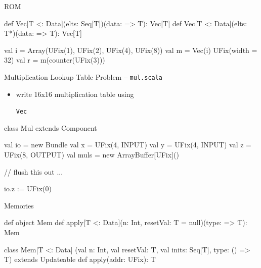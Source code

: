 \documentclass[xcolor=pdflatex,dvipsnames,table]{beamer}
\newcommand{\code}[1]{\begin{footnotesize}{\tt #1}\end{footnotesize}}
\begin{document}
\begin{frame}[fragile]{ROM}

\begin{scala}
def Vec[T <: Data](elts: Seq[T])(data: => T): Vec[T]
def Vec[T <: Data](elts: T*)(data: => T): Vec[T]
\end{scala}

\begin{scala}
val i = Array(UFix(1), UFix(2), UFix(4), UFix(8))
val m = Vec(i){ UFix(width = 32) }
val r = m(counter(UFix(3)))
\end{scala}

% 

\end{frame}

\begin{frame}[fragile]{Multiplication Lookup Table Problem -- \tt mul.scala}
\begin{itemize}
\item write 16x16 multiplication table using \code{Vec}
\end{itemize}
\begin{scala}
class Mul extends Component {
  val io = new Bundle {
    val x   = UFix(4, INPUT)
    val y   = UFix(4, INPUT)
    val z   = UFix(8, OUTPUT)
  }
  val muls = new ArrayBuffer[UFix]()

  // flush this out ...

  io.z := UFix(0)
}
\end{scala}

\end{frame}

\begin{frame}[fragile]{Memories}

\begin{scala}
def object Mem {
  def apply[T <: Data](n: Int, resetVal: T = null)(type: => T): Mem
}

class Mem[T <: Data]
    (val n: Int, val resetVal: T, val inits: Seq[T], type: () => T) 
      extends Updateable {
  def apply(addr: UFix): T
}
\end{scala}

\end{frame}
\end{document}
